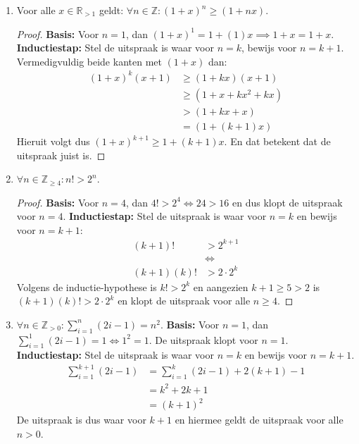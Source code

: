 \documentclass{article}
\begin{document}
\begin{enumerate}[label=\alph*)]
\begin{proof}
            Echter aangezien $a < n$ geldt $\exists p \in \mathbb{P} : p | a$ en uit $  a | n$ volgt $p | n$.
        \end{proof}
    \item Voor alle $x \in \mathbb{R}_{>1}$ geldt: $\forall n \in \mathbb{Z}: (1+x)^n \geq (1+nx)$. 
        \begin{proof}
            \textbf{Basis:} Voor $n=1$, dan $(1+x)^1 = 1+(1)x \implies 1 + x = 1+ x$. 
            \textbf{Inductiestap:} Stel de uitspraak is waar voor $n=k$, bewijs voor $n=k+1$.
            Vermedigvuldig beide kanten met $(1+x)$ dan:
                \begin{align*}
                    (1+x)^k(x+1) &\geq (1 + kx)(x+1) \\
                    &\geq (1 + x + kx^2 + kx) \\
                    &> (1+kx +x) \\  
                    &= (1+(k+1)x)
                \end{align*}
                Hieruit volgt dus $(1+x)^{k+1} \geq 1+(k+1)x$. En dat betekent dat de uitspraak juist is.
        \end{proof}
    \item $\forall n \in \mathbb{Z}_{\geq 4}: n! > 2^n.$
    \begin{proof}
        \textbf{Basis:} Voor $n=4$, dan $4! > 2^4 \Leftrightarrow 24 > 16$ en dus klopt de uitspraak voor $n=4$. 
        \textbf{Inductiestap:} Stel de uitspraak is waar voor $n=k$ en bewijs voor $n=k+1$:
            \begin{align*}
                (k+1)! &> 2^{k+1} \\
                &\Leftrightarrow \\
                (k+1)(k)! &> 2 \cdot 2^k 
            \end{align*}
            Volgens de inductie-hypothese is $k! > 2^k$ en aangezien $k+1\geq 5>2$ is $(k+1)(k)! > 2 \cdot 2^k$ en klopt de uitspraak voor alle $n \geq 4$.
    \end{proof}
    \item $\forall n \in \mathbb{Z}_{>0} : \sum_{i=1}^{n}(2i-1) = n^2$.
    \textbf{Basis:} Voor $n=1$, dan $\sum_{i=1}^{1}(2i-1)=1 \Leftrightarrow 1^2 = 1$. De uitspraak klopt voor $n=1$.
    \textbf{Inductiestap:} Stel de uitspraak is waar voor $n=k$ en bewijs voor $n=k+1$. 
        \begin{align*}
            \sum_{i=1}^{k+1}(2i-1) &= \sum_{i=1}^{k}(2i-1) + 2(k+1)-1 \\
            &= k^2+2k+1 \\
            &= (k+1)^2
        \end{align*}
        De uitspraak is dus waar voor $k+1$ en hiermee geldt de uitspraak voor alle $n>0$.
\end{enumerate}
\subsection{}
\end{document}
